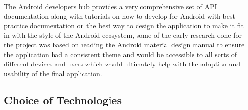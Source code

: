 \\
The Android developers hub provides a very comprehensive set of API documentation along with tutorials on how to develop for Android with best practice documentation on the best way to design the application to make it fit in with the style of the Android ecosystem, some of the early research done for the project was based on reading the Android material design manual to ensure the application had a consistent theme and would be accessible to all sorts of different devices and users which would ultimately help with the adoption and usability of the final application.\\

\subsection{Choice of Technologies}
\label{sec:android_choice_of_tech}

